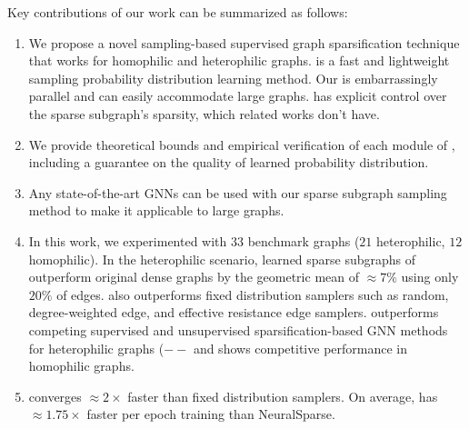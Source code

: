 Key contributions of our work can be summarized as follows:

\begin{enumerate}

    \item We propose a novel sampling-based supervised graph sparsification technique that works for homophilic and heterophilic graphs. \sgs is a fast and lightweight sampling probability distribution learning method. Our \edgemlp is embarrassingly parallel and can easily accommodate large graphs. \sgs has explicit control over the sparse subgraph's sparsity, which related works don't have.

    \item We provide theoretical bounds and empirical verification of each module of \sgs, including a guarantee on the quality of learned probability distribution. 

    \item Any state-of-the-art GNNs can be used with our sparse subgraph sampling method to make it applicable to large graphs.

    \item In this work, we experimented with $33$ benchmark graphs ($21$ heterophilic, $12$ homophilic). In the heterophilic scenario, learned sparse subgraphs of \sgs outperform original dense graphs by the geometric mean of {\color{blue}$\approx 7\%$} using only $20\%$ of edges. \edgemlp also outperforms fixed distribution samplers such as random, degree-weighted edge, and effective resistance edge samplers. \sgs outperforms competing supervised and unsupervised sparsification-based GNN methods for heterophilic graphs ({\color{blue}$--$} and shows competitive performance in homophilic graphs.

    \item \sgs converges {\color{blue}$\approx 2\times$} faster than fixed distribution samplers. On average, \sgs has {\color{blue}$\approx 1.75\times$} faster per epoch training than NeuralSparse.
\end{enumerate}